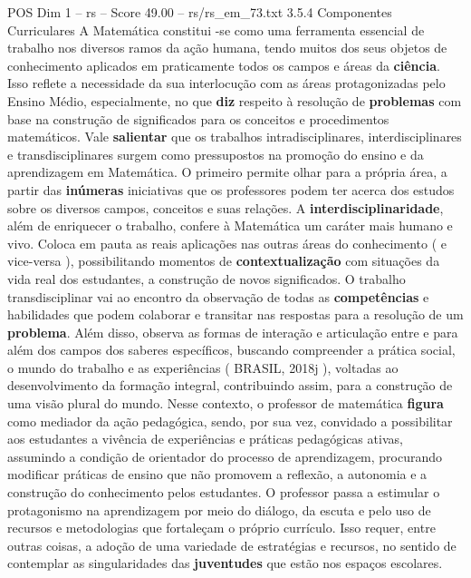\begin{textsample}{POS Dim 1 – rs – Score 49.00 – rs/rs\_em\_73.txt}  \label{ex:f1_pos_205}
3.5.4 Componentes Curriculares A Matemática constitui -se como uma ferramenta essencial de trabalho nos diversos ramos da ação humana, tendo muitos dos seus objetos de conhecimento aplicados em praticamente todos os campos e áreas da \textbf{ciência}.
Isso reflete a necessidade da sua interlocução com as áreas protagonizadas pelo Ensino Médio, especialmente, no que \textbf{diz} respeito à resolução de \textbf{problemas} com base na construção de significados para os conceitos e procedimentos matemáticos.
Vale \textbf{salientar} que os trabalhos intradisciplinares, interdisciplinares e transdisciplinares surgem como pressupostos na promoção do ensino e da aprendizagem em Matemática.
O primeiro permite olhar para a própria área, a partir das \textbf{inúmeras} iniciativas que os professores podem ter acerca dos estudos sobre os diversos campos, conceitos e suas relações.
A \textbf{interdisciplinaridade}, além de enriquecer o trabalho, confere à Matemática um caráter mais humano e vivo.
Coloca em pauta as reais aplicações nas outras áreas do conhecimento ( e vice-versa ), possibilitando momentos de \textbf{contextualização} com situações da vida real dos estudantes, a construção de novos significados.
O trabalho transdisciplinar vai ao encontro da observação de todas as \textbf{competências} e habilidades que podem colaborar e transitar nas respostas para a resolução de um \textbf{problema}.
Além disso, observa as formas de interação e articulação entre e para além dos campos dos saberes específicos, buscando compreender a prática social, o mundo do trabalho e as experiências ( BRASIL, 2018j ), voltadas ao desenvolvimento da formação integral, contribuindo assim, para a construção de uma visão plural do mundo.
Nesse contexto, o professor de matemática \textbf{figura} como mediador da ação pedagógica, sendo, por sua vez, convidado a possibilitar aos estudantes a vivência de experiências e práticas pedagógicas ativas, assumindo a condição de orientador do processo de aprendizagem, procurando modificar práticas de ensino que não promovem a reflexão, a autonomia e a construção do conhecimento pelos estudantes.
O professor passa a estimular o protagonismo na aprendizagem por meio do diálogo, da escuta e pelo uso de recursos e metodologias que fortaleçam o próprio currículo.
Isso requer, entre outras coisas, a adoção de uma variedade de estratégias e recursos, no sentido de contemplar as singularidades das \textbf{juventudes} que estão nos espaços escolares.

\end{textsample}
